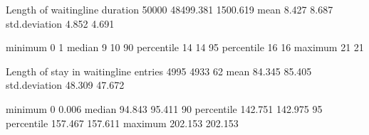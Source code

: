 \documentclass[letterpaper,10pt,english]{sphinxmanual}
\begin{document}
%
\begin{sphinxVerbatim}[commandchars=\\\{\}]
\PYGZhy{}\PYGZhy{}\PYGZhy{}\PYGZhy{}\PYGZhy{}\PYGZhy{}\PYGZhy{}\PYGZhy{}\PYGZhy{}\PYGZhy{}\PYGZhy{}\PYGZhy{}\PYGZhy{}\PYGZhy{}\PYGZhy{}\PYGZhy{}\PYGZhy{}\PYGZhy{}\PYGZhy{}\PYGZhy{}\PYGZhy{}\PYGZhy{}\PYGZhy{}\PYGZhy{}\PYGZhy{}\PYGZhy{}\PYGZhy{}\PYGZhy{}\PYGZhy{}\PYGZhy{}\PYGZhy{}\PYGZhy{}\PYGZhy{}\PYGZhy{}\PYGZhy{}\PYGZhy{}\PYGZhy{}\PYGZhy{}\PYGZhy{}\PYGZhy{}\PYGZhy{}\PYGZhy{}\PYGZhy{}\PYGZhy{} \PYGZhy{}\PYGZhy{}\PYGZhy{}\PYGZhy{}\PYGZhy{}\PYGZhy{}\PYGZhy{}\PYGZhy{}\PYGZhy{}\PYGZhy{}\PYGZhy{}\PYGZhy{}\PYGZhy{}\PYGZhy{} \PYGZhy{}\PYGZhy{}\PYGZhy{}\PYGZhy{}\PYGZhy{}\PYGZhy{}\PYGZhy{}\PYGZhy{}\PYGZhy{}\PYGZhy{}\PYGZhy{}\PYGZhy{} \PYGZhy{}\PYGZhy{}\PYGZhy{}\PYGZhy{}\PYGZhy{}\PYGZhy{}\PYGZhy{}\PYGZhy{}\PYGZhy{}\PYGZhy{}\PYGZhy{}\PYGZhy{} \PYGZhy{}\PYGZhy{}\PYGZhy{}\PYGZhy{}\PYGZhy{}\PYGZhy{}\PYGZhy{}\PYGZhy{}\PYGZhy{}\PYGZhy{}\PYGZhy{}\PYGZhy{}
Length of waitingline                        duration          50000        48499.381     1500.619
                                             mean                  8.427        8.687
                                             std.deviation         4.852        4.691

                                             minimum               0            1
                                             median                9           10
                                             90\PYGZpc{} percentile       14           14
                                             95\PYGZpc{} percentile       16           16
                                             maximum              21           21

Length of stay in waitingline                entries            4995         4933           62
                                             mean                 84.345       85.405
                                             std.deviation        48.309       47.672

                                             minimum               0            0.006
                                             median               94.843       95.411
                                             90\PYGZpc{} percentile      142.751      142.975
                                             95\PYGZpc{} percentile      157.467      157.611
                                             maximum             202.153      202.153
\end{sphinxVerbatim}
\end{document}
